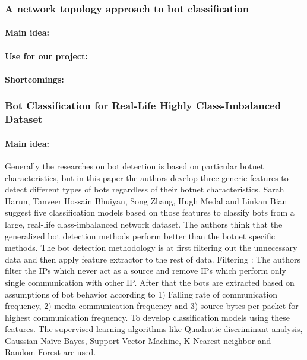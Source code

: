 \subsubsection{A network topology approach to bot classification}

\paragraph{Main idea:}

\cite{cornelissen2018network}

\paragraph{Use for our project:}

\paragraph{Shortcomings:}
\subsubsection{Bot Classification for Real-Life Highly Class-Imbalanced Dataset}

\paragraph{Main idea:}
Generally the researches on bot detection is based on particular botnet characteristics, but in this paper the authors develop three generic features to detect different types of bots regardless of their botnet characteristics. Sarah Harun, Tanveer Hossain Bhuiyan, Song Zhang, Hugh Medal and Linkan Bian~\cite{harun2017bot} suggest five classification models based on those features to classify bots from a large, real-life class-imbalanced network dataset. The authors think that the generalized bot detection methods perform better than the botnet specific methods. 
The bot detection methodology is at first filtering out the unnecessary data and then apply feature extractor to the rest of data. Filtering : The authors filter the IPs which never act as a source and remove IPs which perform only single communication with other IP. After that the bots are extracted based on assumptions of bot behavior according to 1) Falling rate of communication frequency, 2) media communication frequency and 3) source bytes per packet for highest communication frequency.  To develop classification models using these features. The supervised learning algorithms like Quadratic discriminant analysis, Gaussian Naïve Bayes, Support Vector Machine, K Nearest neighbor and Random Forest are used. 

